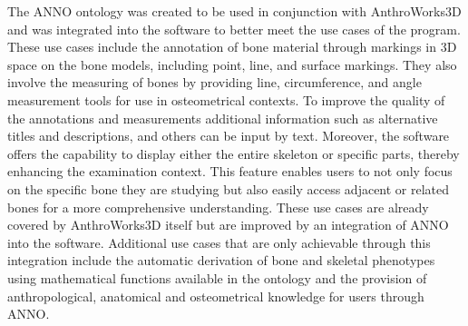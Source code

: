 \documentclass[sw]{iosart2x}
\newcommand{\aw}{AnthroWorks3D}
\begin{document}
The ANNO ontology was created to be used in conjunction with \aw{} and was integrated into the software to better meet the use cases of the program.
These use cases include the annotation of bone material through markings in 3D space on the bone models, including point, line, and surface markings.
They also involve the measuring of bones by providing line, circumference, and angle measurement tools for use in osteometrical contexts.
To improve the quality of the annotations and measurements additional information such as alternative titles and descriptions, and others can be input by text.
Moreover, the software offers the capability to display either the entire skeleton or specific parts, thereby enhancing the examination context.
This feature enables users to not only focus on the specific bone they are studying but also easily access adjacent or related bones for a more comprehensive understanding.
These use cases are already covered by \aw{} itself but are improved by an integration of ANNO into the software.
Additional use cases that are only achievable through this integration include the automatic derivation of bone and skeletal phenotypes using mathematical functions available in the ontology and the provision of anthropological, anatomical and osteometrical knowledge for users through ANNO.
\end{document}

